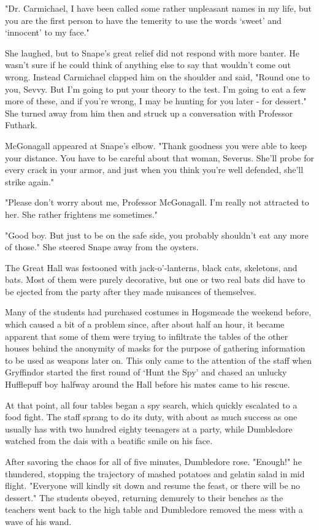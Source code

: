 "Dr. Carmichael, I have been called some rather unpleasant names in my life, but you are the first person to have the temerity to use the words `sweet' and `innocent' to my face."

She laughed, but to Snape's great relief did not respond with more banter. He wasn't sure if he could think of anything else to say that wouldn't come out wrong. Instead Carmichael clapped him on the shoulder and said, "Round one to you, Sevvy. But I'm going to put your theory to the test. I'm going to eat a few more of these, and if you're wrong, I may be hunting for you later - for dessert." She turned away from him then and struck up a conversation with Professor Futhark.

McGonagall appeared at Snape's elbow. "Thank goodness you were able to keep your distance. You have to be careful about that woman, Severus. She'll probe for every crack in your armor, and just when you think you're well defended, she'll strike again."

"Please don't worry about me, Professor McGonagall. I'm really not attracted to her. She rather frightens me sometimes."

"Good boy. But just to be on the safe side, you probably shouldn't eat any more of those." She steered Snape away from the oysters.

The Great Hall was festooned with jack-o'-lanterns, black cats, skeletons, and bats. Most of them were purely decorative, but one or two real bats did have to be ejected from the party after they made nuisances of themselves.

Many of the students had purchased costumes in Hogsmeade the weekend before, which caused a bit of a problem since, after about half an hour, it became apparent that some of them were trying to infiltrate the tables of the other houses behind the anonymity of masks for the purpose of gathering information to be used as weapons later on. This only came to the attention of the staff when Gryffindor started the first round of `Hunt the Spy' and chased an unlucky Hufflepuff boy halfway around the Hall before his mates came to his rescue.

At that point, all four tables began a spy search, which quickly escalated to a food fight. The staff sprang to do its duty, with about as much success as one usually has with two hundred eighty teenagers at a party, while Dumbledore watched from the dais with a beatific smile on his face.

After savoring the chaos for all of five minutes, Dumbledore rose. "Enough!" he thundered, stopping the trajectory of mashed potatoes and gelatin salad in mid flight. "Everyone will kindly sit down and resume the feast, or there will be no dessert." The students obeyed, returning demurely to their benches as the teachers went back to the high table and Dumbledore removed the mess with a wave of his wand.

